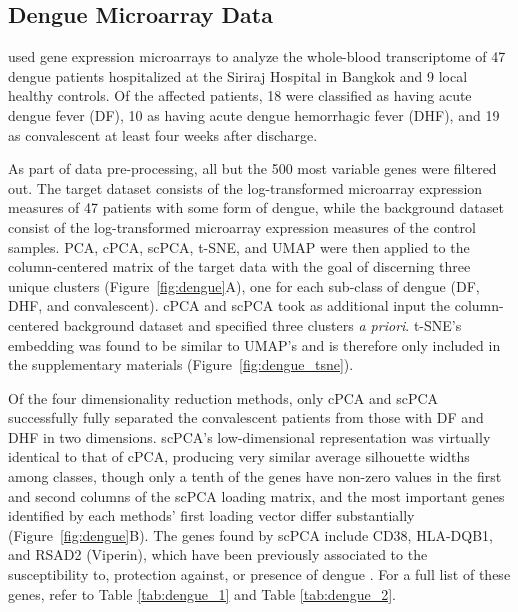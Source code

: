\subsection{Dengue Microarray Data}\label{dengue_data}

\citet{Kwissa2014} used gene expression microarrays to analyze the whole-blood transcriptome of 47 dengue patients hospitalized at the Siriraj Hospital in Bangkok and 9 local healthy controls. Of the affected patients, 18 were classified as having acute dengue fever (DF), 10 as having acute dengue hemorrhagic fever (DHF), and 19 as convalescent at least four weeks after discharge.

As part of data pre-processing, all but the 500 most variable genes were filtered out. The target dataset consists of the log-transformed microarray expression measures of 47 patients with some form of dengue, while the background dataset consist of the log-transformed microarray expression measures of the control samples. PCA, cPCA, scPCA, t-SNE, and UMAP were then applied to the column-centered matrix of the target data with the goal of discerning three unique clusters (Figure~\ref{fig:dengue}A), one for each sub-class of dengue (DF, DHF, and convalescent). cPCA and scPCA took as additional input the column-centered background dataset and specified three clusters \textit{a priori}. t-SNE's embedding was found to be similar to UMAP's and is therefore only included in the supplementary materials (Figure~\ref{fig:dengue_tsne}).

Of the four dimensionality reduction methods, only cPCA and scPCA successfully fully separated the convalescent patients from those with DF and DHF in two dimensions. scPCA's low-dimensional representation was virtually identical to that of cPCA, producing very similar average silhouette widths among classes, though only a tenth of the genes have non-zero values in the first and second columns of the scPCA loading matrix, and the most important genes identified by each methods' first loading vector differ substantially (Figure~\ref{fig:dengue}B). The genes found by scPCA include CD38, HLA-DQB1, and RSAD2 (Viperin), which have been previously associated to the susceptibility to, protection against, or presence of dengue \citep{Castaneda2016,Cardozo2014,Fitzgerald2011}. For a full list of these genes, refer to Table \ref{tab:dengue_1} and Table \ref{tab:dengue_2}. 

